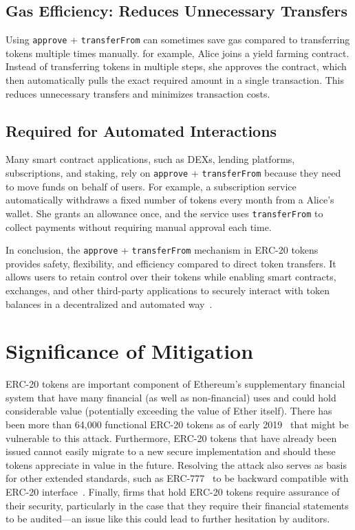 \subsection{Gas Efficiency: Reduces Unnecessary Transfers}
Using \texttt{approve} + \texttt{transferFrom} can sometimes save gas compared to transferring tokens multiple times manually. for example, Alice joins a yield farming contract. Instead of transferring tokens in multiple steps, she approves the contract, which then automatically pulls the exact required amount in a single transaction. This reduces unnecessary transfers and minimizes transaction costs.

\subsection{Required for Automated Interactions}
Many smart contract applications, such as DEXs, lending platforms, subscriptions, and staking, rely on \texttt{approve} + \texttt{transferFrom} because they need to move funds on behalf of users. For example, a subscription service automatically withdraws a fixed number of tokens every month from a Alice's wallet. She grants an allowance once, and the service uses \texttt{transferFrom} to collect payments without requiring manual approval each time.

In conclusion, the \texttt{approve} + \texttt{transferFrom} mechanism in ERC-20 tokens provides safety, flexibility, and efficiency compared to direct token transfers. It allows users to retain control over their tokens while enabling smart contracts, exchanges, and other third-party applications to securely interact with token balances in a decentralized and automated way~\cite{zhang2020survey}.

\section{Significance of Mitigation}
ERC-20 tokens are important component of Ethereum's supplementary financial system that have many financial (as well as non-financial) uses and could hold considerable value (potentially exceeding the value of Ether itself). There has been more than 64,000 functional ERC-20 tokens as of early 2019~\cite{victormeasuring} that might be vulnerable to this attack. Furthermore, ERC-20 tokens that have already been issued cannot easily migrate to a new secure implementation and should these tokens appreciate in value in the future. Resolving the attack also serves as basis for other extended standards, such as ERC-777~\cite{EIP777} to be backward compatible with ERC-20 interface~\cite{frowis2018detecting}. Finally, firms that hold ERC-20 tokens require assurance of their security, particularly in the case that they require their financial statements to be audited---an issue like this could lead to further hesitation by auditors.

